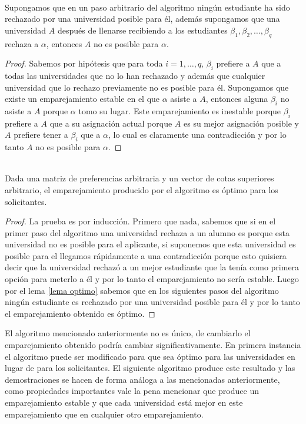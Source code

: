\begin{lem} 
\label{lema optimo} 
\cite{GaleShapley} \\
Supongamos que en un paso arbitrario del algoritmo ningún estudiante ha sido rechazado por una universidad posible para él, además supongamos que una universidad $A$ después de llenarse recibiendo a los estudiantes $\beta_1,\beta_2,\dots,\beta_q$ rechaza a $\alpha$, entonces $A$ no es posible para $\alpha$.
\end{lem}
\begin{proof}
Sabemos por hipótesis que para toda $i=1,\dots,q$, $\beta_i$ prefiere a $A$ que a todas las universidades que no lo han rechazado y además que cualquier universidad que lo rechazo previamente no es posible para él. Supongamos que existe un emparejamiento estable en el que $\alpha$ asiste a $A$, entonces alguna $\beta_i$ no asiste a $A$ porque $\alpha$ tomo su lugar. Este emparejamiento es inestable porque $\beta_i$ prefiere a $A$ que a su asignación actual porque $A$ es su mejor asignación posible y $A$ prefiere tener a $\beta_i$ que a $\alpha$, lo cual es claramente una contradicción y por lo tanto $A$ no es posible para $\alpha$.
\end{proof}

\begin{teo}
\label{optimo}
\cite{GaleShapley} \\
Dada una matriz de preferencias arbitraria y un vector de cotas superiores arbitrario, el emparejamiento producido por el algoritmo es óptimo para los solicitantes.
\end{teo}
\begin{proof}
La prueba es por inducción. Primero que nada, sabemos que si en el primer paso del algoritmo una universidad rechaza a un alumno es porque esta universidad no es posible para el aplicante, si suponemos que esta universidad es posible para el llegamos rápidamente a una contradicción porque esto quisiera decir que la universidad rechazó a un mejor estudiante que la tenía como primera opción para meterlo a él y por lo tanto el emparejamiento no sería estable. Luego por el lema \ref{lema optimo} sabemos que en los siguientes pasos del algoritmo ningún estudiante es rechazado por una universidad posible para él y por lo tanto el emparejamiento obtenido es óptimo. 
\end{proof}

El algoritmo mencionado anteriormente no es único, de cambiarlo el emparejamiento obtenido podría cambiar significativamente. En primera instancia el algoritmo puede ser modificado para que sea óptimo para las universidades en lugar de para los solicitantes. El siguiente algoritmo produce este resultado y las demostraciones se hacen de forma análoga a las mencionadas anteriormente, como propiedades importantes vale la pena mencionar que produce un emparejamiento estable y que cada universidad está mejor en este emparejamiento que en cualquier otro emparejamiento. 

